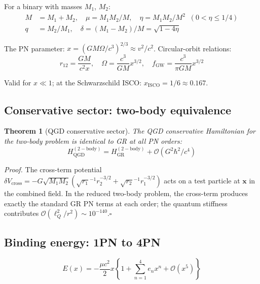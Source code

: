 \documentclass[11pt,a4paper]{article}
\theoremstyle{plain}
\newtheorem{theorem}{Theorem}[section]
\theoremstyle{definition}
\theoremstyle{remark}
\newcommand{\lQ}{\ell_Q}
\newcommand{\boldx}{\mathbf{x}}
\begin{document}
For a binary with masses $M_1$, $M_2$:
\begin{align}
  M &= M_1 + M_2, \quad \mu = M_1M_2/M, \quad \eta = M_1M_2/M^2 \;\;(0 < \eta \leq 1/4) \\
  q &= M_2/M_1, \quad \delta = (M_1 - M_2)/M = \sqrt{1 - 4\eta}
\end{align}

The PN parameter: $x = (GM\Omega/c^3)^{2/3} \approx v^2/c^2$.  Circular-orbit relations:
\begin{equation}
  r_{12} = \frac{GM}{c^2x}, \quad \Omega = \frac{c^3}{GM}x^{3/2}, \quad f_{\mathrm{GW}} = \frac{c^3}{\pi GM}x^{3/2}
\end{equation}

Valid for $x \ll 1$; at the Schwarzschild ISCO: $x_{\mathrm{ISCO}} = 1/6 \approx 0.167$.

\subsection{Conservative sector: two-body equivalence}

\begin{theorem}[QGD conservative sector]\label{thm:conservative}
  The QGD conservative Hamiltonian for the two-body problem is identical to GR at all PN orders:
  \begin{equation}
    H_{\mathrm{QGD}}^{(\mathrm{2-body})} = H_{\mathrm{GR}}^{(\mathrm{2-body})} + \mathcal{O}(G^2\hbar^2/c^4)
  \end{equation}
\end{theorem}

\emph{Proof.}  The cross-term potential $\delta V_{\mathrm{cross}} = -G\sqrt{M_1M_2}(\sqrt{r_1}^{-1}r_2^{-3/2} + \sqrt{r_2}^{-1}r_1^{-3/2})$ acts on a test particle at $\boldx$ in the combined field.  In the reduced two-body problem, the cross-term produces exactly the standard GR PN terms at each order; the quantum stiffness contributes $\mathcal{O}(\lQ^2/r^2) \sim 10^{-140}$.\hfill$\square$

\subsection{Binding energy: 1PN to 4PN}

\begin{equation}
  E(x) = -\frac{\mu c^2}{2}x\left\{1 + \sum_{n=1}^4 e_n x^n + \mathcal{O}(x^5)\right\}
\end{equation}
\end{document}
